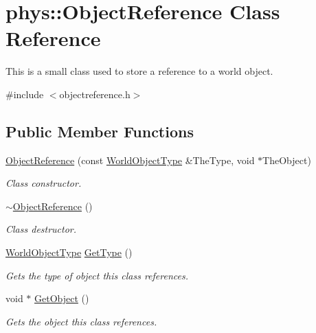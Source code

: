 \hypertarget{classphys_1_1ObjectReference}{
\section{phys::ObjectReference Class Reference}
\label{d6/d54/classphys_1_1ObjectReference}
}


This is a small class used to store a reference to a world object.  




{\ttfamily \#include $<$objectreference.h$>$}

\subsection*{Public Member Functions}
\begin{DoxyCompactItemize}
\item 
\hyperlink{classphys_1_1ObjectReference_aa97733aef863b81f9fdbb4455d60d7e9}{ObjectReference} (const \hyperlink{namespacephys_a56410935e1c614a932dbc91ee7330df1}{WorldObjectType} \&TheType, void $\ast$TheObject)
\begin{DoxyCompactList}\small\item\em Class constructor. \item\end{DoxyCompactList}\item 
\hypertarget{classphys_1_1ObjectReference_ae0205396bc65406316730a6cd5bdc237}{
\hyperlink{classphys_1_1ObjectReference_ae0205396bc65406316730a6cd5bdc237}{$\sim$ObjectReference} ()}
\label{d6/d54/classphys_1_1ObjectReference_ae0205396bc65406316730a6cd5bdc237}

\begin{DoxyCompactList}\small\item\em Class destructor. \item\end{DoxyCompactList}\item 
\hyperlink{namespacephys_a56410935e1c614a932dbc91ee7330df1}{WorldObjectType} \hyperlink{classphys_1_1ObjectReference_aea70ac457331e5b20a7487e2d93ba005}{GetType} ()
\begin{DoxyCompactList}\small\item\em Gets the type of object this class references. \item\end{DoxyCompactList}\item 
void $\ast$ \hyperlink{classphys_1_1ObjectReference_a729c6e6b0ec5f0bbc7eb19987235729e}{GetObject} ()
\begin{DoxyCompactList}\small\item\em Gets the object this class references. \item\end{DoxyCompactList}\end{DoxyCompactItemize}
